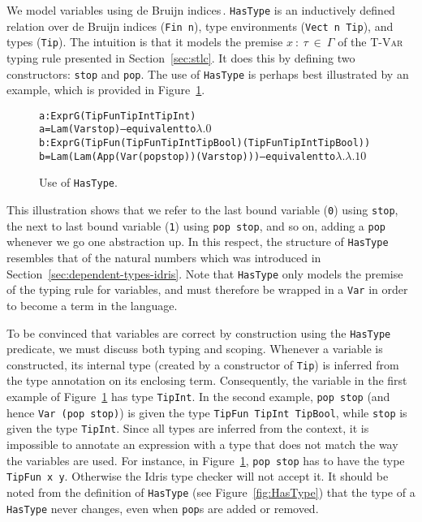 We model variables using de Bruijn indices\,\cite{Bruijn72lambdacalculus}. \texttt{HasType} is an inductively defined relation over de Bruijn indices (\texttt{Fin n}), type environments (\texttt{Vect n Tip}), and types (\texttt{Tip}). The intuition is that it models the premise $x~:~\tau~\in~\Gamma$ of the \textsc{T-Var} typing rule presented in Section~\ref{sec:stlc}. It does this by defining two constructors: \texttt{stop} and \texttt{pop}. The use of \texttt{HasType} is perhaps best illustrated by an example, which is provided in Figure~\ref{fig:HasType-use}. 

\begin{figure}
\begin{alltt}
  a : Expr G (TipFun TipInt TipInt)
  a = Lam (Var stop)                              -- equivalent to \(\lambda.0\)
  b : Expr G (TipFun (TipFun TipInt TipBool) (TipFun TipInt TipBool))
  b = Lam (Lam (App (Var (pop stop)) (Var stop))) -- equivalent to \(\lambda.\lambda.1 0\)
\end{alltt}
\caption{Use of \texttt{HasType}.}
\label{fig:HasType-use}
\end{figure}

This illustration shows that we refer to the last bound variable (\texttt{0}) using \texttt{stop}, the next to last bound variable (\texttt{1}) using \texttt{pop stop}, and so on, adding a \texttt{pop} whenever we go one abstraction up. In this respect, the structure of \texttt{HasType} resembles that of the natural numbers which was introduced in Section~\ref{sec:dependent-types-idris}. Note that \texttt{HasType} only models the premise of the typing rule for variables, and must therefore be wrapped in a \texttt{Var} in order to become a term in the language.

To be convinced that variables are correct by construction using the \texttt{HasType} predicate, we must discuss both typing and scoping. Whenever a variable is constructed, its internal type (created by a constructor of \texttt{Tip}) is inferred from the type annotation on its enclosing term. Consequently, the variable in the first example of Figure~\ref{fig:HasType-use} has type \texttt{TipInt}. In the second example, \texttt{pop stop} (and hence \texttt{Var (pop stop)}) is given the type \texttt{TipFun TipInt TipBool}, while \texttt{stop} is given the type \texttt{TipInt}. Since all types are inferred from the context, it is impossible to annotate an expression with a type that does not match the way the variables are used. For instance, in Figure~\ref{fig:HasType-use}, \texttt{pop stop} has to have the type \texttt{TipFun x y}. Otherwise the Idris type checker will not accept it. It should be noted from the definition of \texttt{HasType} (see Figure~\ref{fig:HasType}) that the type of a \texttt{HasType} never changes, even when \texttt{pop}s are added or removed. 

